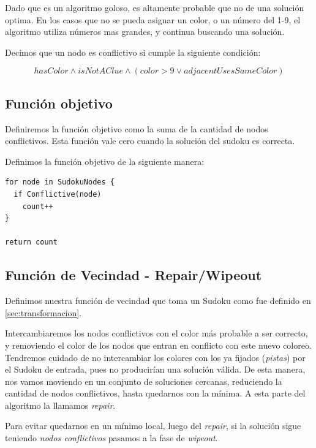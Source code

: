 \documentclass[a4paper,spanish]{article}
\begin{document}
Dado que es un algoritmo goloso, es altamente probable que no de una solución optima.
En los casos que no se pueda asignar un color, o un número del 1-9, el algoritmo
utiliza números mas grandes, y continua buscando una solución.

Decimos que un nodo es conflictivo si cumple la siguiente condición:

\begin{equation}
    hasColor \wedge isNotAClue \wedge ( color > 9 \vee adjacentUsesSameColor)
\end{equation}


\subsection{Función objetivo}

Definiremos la función objetivo como la suma de la cantidad de nodos conflictivos. 
Esta función vale cero cuando la solución del sudoku es correcta.

Definimos la función objetivo de la siguiente manera: 

\begin{Verbatim}[samepage=true]
for node in SudokuNodes {
  if Conflictive(node)
    count++
}

return count
\end{Verbatim}


\subsection{Función de Vecindad - Repair/Wipeout}

Definimos nuestra función de vecindad que toma un Sudoku como fue
definido en \ref{sec:transformacion}.

Intercambiaremos los nodos conflictivos con el color más probable a ser correcto,
y removiendo el color de los nodos que entran en conflicto con este nuevo coloreo.
Tendremos cuidado de no intercambiar los colores con los ya fijados (\emph{pistas})
por el Sudoku de entrada, pues no producirían una solución válida.
De esta manera, nos vamos moviendo en un conjunto de soluciones cercanas, reduciendo
la cantidad de nodos conflictivos, hasta quedarnos con la mínima.
A esta parte del algoritmo la llamamos \emph{repair}.

Para evitar quedarnos en un mínimo local, luego del \emph{repair}, si la solución
sigue teniendo \textit{nodos conflictivos} pasamos a la fase de \emph{wipeout}.
\end{document}
